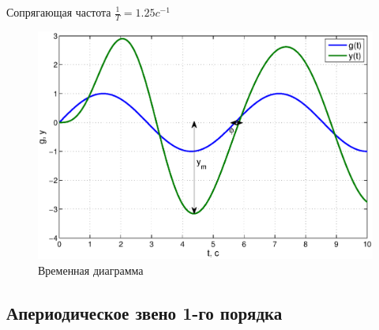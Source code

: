 \documentclass[a4paper,12pt]{article} %
\begin{document}
\par
Сопрягающая частота $\frac{1}{T}=1.25c^{-1}$
\begin{figure}[H]
	\centering
	\includegraphics[width=0.8\linewidth]{scheme/timedia.eps}
	\caption{Временная диаграмма}
\end{figure}

\newpage
\begin{center}
\section{Апериодическое звено 1-го порядка}
\end{center}
\end{document}
